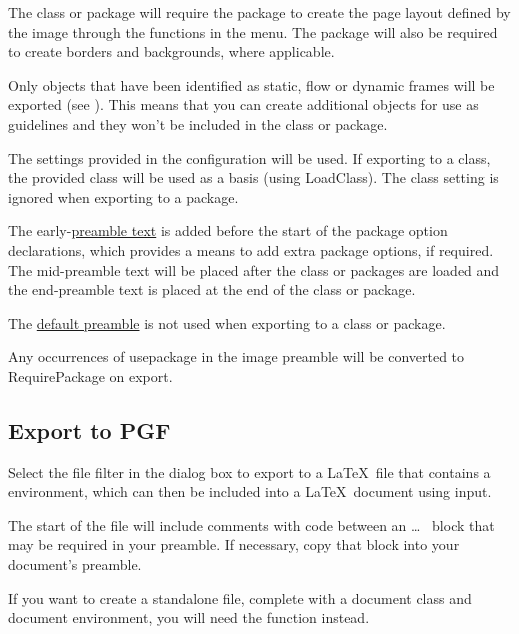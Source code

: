 The class or package will require the  package to
create the page layout defined by the image through the functions in
the  menu.  The  package will also be
required to create borders and backgrounds, where applicable.

Only \glspl{object} that have been identified as static, flow or
dynamic frames will be exported (see ).
This means that you can create additional \glspl{object} for use as
guidelines and they won't be included in the class or package.

The settings provided in the  configuration
will be used. If exporting to a class, the provided class will be
used as a basis (using \gls{LoadClass}). The class setting is
ignored when exporting to a package.

The early-\hyperref[sec:preamble]{preamble text} is added before the
start of the package option declarations, which provides a means to
add extra package options, if required.  The mid-preamble text will
be placed after the class or packages are loaded and the
end-preamble text is placed at the end of the class or package.

\begin{important}
The \hyperref[sec:texconfigpreamble]{default preamble} is not used
when exporting to a class or package.
\end{important}

Any occurrences of \gls{usepackage} in the image
preamble will be converted to \gls{RequirePackage} on export.


\subsection{Export to PGF}\label{sec:exportpgf}

Select the  file filter in the 
dialog box to export to a \LaTeX\ file that contains a
 environment, which can then be included into a
\LaTeX\ document using \gls{input}.

The start of the file will include comments with
code between an  \ldots\  block
that may be required in your preamble. If necessary, copy that block
into your document's preamble.

If you want to create a standalone file, complete with a document
class and document environment, you will need the
 function instead.

